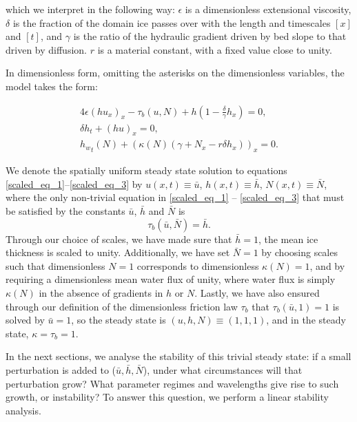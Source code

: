 \documentclass[journal abbreviation, manuscript]{copernicus}
\begin{document}
which we interpret in the 
following way: $\epsilon$ is a dimensionless extensional viscosity, 
$\delta$ is the fraction of the domain ice passes over with the length and timescales $[x]$ and $[t]$, and $\gamma$ is the ratio of the hydraulic gradient driven by bed slope to that driven by diffusion.
 $r$ is a material 
constant, with a fixed value close to unity. 

In 
dimensionless form, omitting the asterisks on the 
dimensionless variables, the model takes the form:

\begin{subequations}
\begin{align}
 4  \epsilon\left( h u_x \right)_x -  \tau_b(u ,N) + h \left(1 - \frac{ \delta}{\gamma} h_x \right)=0, \label{scaled_eq_1}\\
\delta h_t +  (h u )_x = 0, \label{scaled_eq_2}\\
  {h_w}_t(N) + \left( \kappa \left( N \right) \left( \gamma
   + N_x - r \delta h_x \right) \right)_x= 0. \label{scaled_eq_3}
\end{align}
\end{subequations}



We denote the spatially 
uniform steady state solution to equations \eqref{scaled_eq_1}--\eqref{scaled_eq_3} by $u(x,t) 
\equiv \bar{u}$, $h(x,t) \equiv \bar{h}$, $N(x,t) \equiv \bar{N}$, where 
the only non-trivial equation in \eqref{scaled_eq_1} -- \eqref{scaled_eq_3} that must be satisfied 
by the constants $\bar{u}$, $\bar{h}$ and $\bar{N}$ is
$$ \tau_b(\bar{u},\bar{N}) = \bar{h}. $$
Through our choice of scales, we have made sure that 
$\bar{h} = 1$, the mean ice thickness is scaled to unity. 
Additionally, we have set $\bar{N} = 1$ by choosing scales such that dimensionless $N = 1$ corresponds to 
dimensionless $\kappa(N) = 1$, and by requiring a dimensionless mean water flux of unity, where water flux is simply $\kappa(N)$ in the absence of 
gradients in $h$ or $N$. Lastly, we have also ensured through our 
definition of the dimensionless friction law $\tau_b$ that 
$\tau_b(\bar{u},1) = 1$ is solved by $\bar{u} = 1$, so the steady state 
is $(u,h,N) \equiv (1,1,1)$, and in the steady state, $\kappa = \tau_b = 
1$. 

In the next 
sections, we analyse the stability of this trivial steady 
state: if a small perturbation is added to ($\bar{u},\bar{h},\bar{N}$), 
under what circumstances will that perturbation grow? What parameter 
regimes and wavelengths give rise to such growth, or instability? To 
answer this question, we perform a linear stability analysis.
\end{document}
